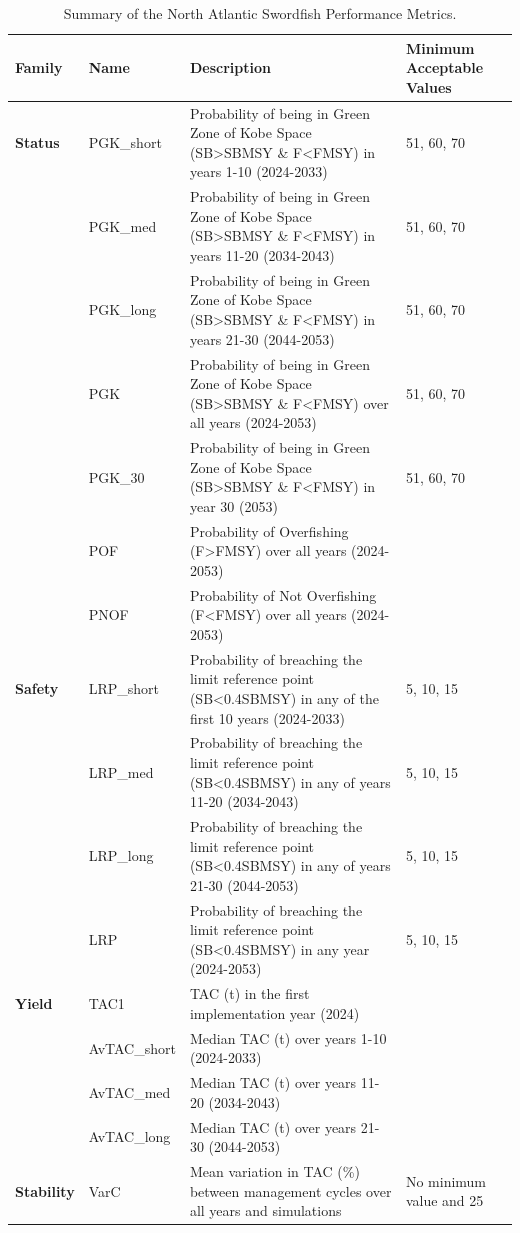\documentclass[
]{article}
\begin{document}
\begin{table}

\caption{\label{tab:PM-Description}Summary of the North Atlantic Swordfish Performance Metrics.}
\centering
\begin{tabu} to 
\toprule
Family & Name & Description & Minimum Acceptable Values\\
\midrule
\textbf{Status} & PGK\_short & Probability of being in Green Zone of Kobe Space (SB>SBMSY \& F<FMSY) in years 1-10 (2024-2033) & 51, 60, 70\\
\textbf{} & PGK\_med & Probability of being in Green Zone of Kobe Space (SB>SBMSY \& F<FMSY) in years 11-20 (2034-2043) & 51, 60, 70\\
\textbf{} & PGK\_long & Probability of being in Green Zone of Kobe Space (SB>SBMSY \& F<FMSY) in years 21-30 (2044-2053) & 51, 60, 70\\
\textbf{} & PGK & Probability of being in Green Zone of Kobe Space (SB>SBMSY \& F<FMSY) over all years (2024-2053) & 51, 60, 70\\
\textbf{} & PGK\_30 & Probability of being in Green Zone of Kobe Space (SB>SBMSY \& F<FMSY) in year 30 (2053) & 51, 60, 70\\
\addlinespace
\textbf{} & POF & Probability of Overfishing (F>FMSY) over all years (2024-2053) & \\
\textbf{} & PNOF & Probability of Not Overfishing (F<FMSY) over all years (2024-2053) & \\
\textbf{Safety} & LRP\_short & Probability of breaching the limit reference point (SB<0.4SBMSY) in any of the first 10 years (2024-2033) & 5, 10, 15\\
\textbf{} & LRP\_med & Probability of breaching the limit reference point (SB<0.4SBMSY) in any of years 11-20 (2034-2043) & 5, 10, 15\\
\textbf{} & LRP\_long & Probability of breaching the limit reference point (SB<0.4SBMSY) in any of years 21-30 (2044-2053) & 5, 10, 15\\
\addlinespace
\textbf{} & LRP & Probability of breaching the limit reference point (SB<0.4SBMSY) in any year (2024-2053) & 5, 10, 15\\
\textbf{Yield} & TAC1 & TAC (t) in the first implementation year (2024) & \\
\textbf{} & AvTAC\_short & Median TAC (t) over years 1-10 (2024-2033) & \\
\textbf{} & AvTAC\_med & Median TAC (t) over years 11-20 (2034-2043) & \\
\textbf{} & AvTAC\_long & Median TAC (t) over years 21-30 (2044-2053) & \\
\addlinespace
\textbf{Stability} & VarC & Mean variation in TAC (\%) between management cycles over all years and simulations & No minimum value and 25\\
\bottomrule
\end{tabu}
\end{table}
\end{document}
